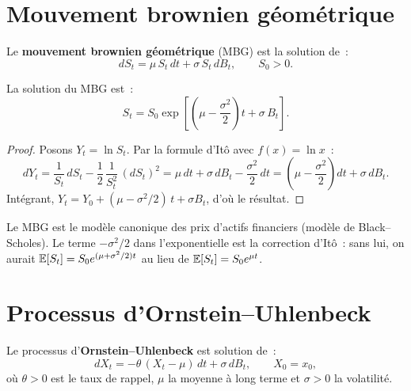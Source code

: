 \section{Mouvement brownien g\'eom\'etrique}
\label{sec:mbg}

\begin{definition}
Le \textbf{mouvement brownien g\'eom\'etrique} (MBG) est la solution de~:
\[
  dS_t = \mu\, S_t\, dt + \sigma\, S_t\, dB_t, \qquad S_0 > 0.
\]
\end{definition}

\begin{theoreme}
\label{thm:mbg_solution}
La solution du MBG est~:
\[
  S_t = S_0 \exp\left[\left(\mu - \frac{\sigma^2}{2}\right)t
    + \sigma\, B_t\right].
\]
\end{theoreme}

\begin{proof}
Posons $Y_t = \ln S_t$. Par la formule d'It\^o avec $f(x) = \ln x$~:
\[
  dY_t = \frac{1}{S_t}\,dS_t - \frac{1}{2}\,\frac{1}{S_t^2}\,(dS_t)^2
  = \mu\,dt + \sigma\,dB_t - \frac{\sigma^2}{2}\,dt
  = \left(\mu - \frac{\sigma^2}{2}\right)dt + \sigma\,dB_t.
\]
Int\'egrant, $Y_t = Y_0 + (\mu - \sigma^2/2)\,t + \sigma B_t$, d'o\`u le r\'esultat.
\end{proof}

\begin{intuition}
Le MBG est le mod\`ele canonique des prix d'actifs financiers (mod\`ele de
Black--Scholes). Le terme $-\sigma^2/2$ dans l'exponentielle est la
correction d'It\^o~: sans lui, on aurait $\mathbb{E}[S_t] = S_0 e^{(\mu + \sigma^2/2)t}$
au lieu de $\mathbb{E}[S_t] = S_0 e^{\mu t}$.
\end{intuition}

\section{Processus d'Ornstein--Uhlenbeck}
\label{sec:ou}

\begin{definition}
Le processus d'\textbf{Ornstein--Uhlenbeck} est solution de~:
\[
  dX_t = -\theta\,(X_t - \mu)\,dt + \sigma\,dB_t, \qquad X_0 = x_0,
\]
o\`u $\theta > 0$ est le taux de rappel, $\mu$ la moyenne \`a long terme
et $\sigma > 0$ la volatilit\'e.
\end{definition}

